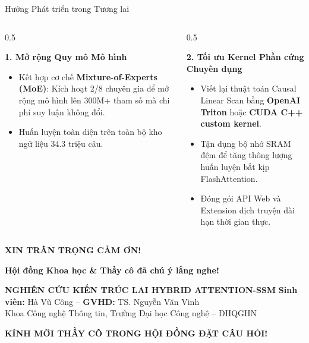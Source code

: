 \documentclass[aspectratio=169, 10pt]{beamer}
\begin{document}
\begin{frame}{Hướng Phát triển trong Tương lai}
  \begin{columns}
    \begin{column}{0.5\textwidth}
      \begin{block}{\textbf{1. Mở rộng Quy mô Mô hình}}
        \begin{itemize}
          \item Kết hợp cơ chế \textbf{Mixture-of-Experts (MoE)}:
            Kích hoạt 2/8 chuyên gia để mở rộng mô hình lên 300M+ tham số mà chi phí suy luận không đổi.
          \item Huấn luyện toàn diện trên toàn bộ kho ngữ liệu 34.3 triệu câu.
        \end{itemize}
      \end{block}
    \end{column}
    \begin{column}{0.5\textwidth}
      \begin{block}{\textbf{2. Tối ưu Kernel Phần cứng Chuyên dụng}}
        \begin{itemize}
          \item Viết lại thuật toán Causal Linear Scan bằng \textbf{OpenAI Triton} hoặc \textbf{CUDA C++ custom kernel}.
          \item Tận dụng bộ nhớ SRAM đệm để tăng thông lượng huấn luyện bắt kịp FlashAttention.
          \item Đóng gói API Web và Extension dịch truyện dài hạn thời gian thực.
        \end{itemize}
      \end{block}
    \end{column}
  \end{columns}
\end{frame}

\begin{frame}[plain]
  \vfill
  \centering
  {\Huge\color{UETBlue}\textbf{XIN TRÂN TRỌNG CẢM ƠN!}\par}
  \vspace{0.4cm}
  {\Large\textbf{Hội đồng Khoa học \& Thầy cô đã chú ý lắng nghe!}\par}
  \vspace{0.6cm}
  \begin{block}{\centering\textbf{NGHIÊN CỨU KIẾN TRÚC LAI HYBRID ATTENTION-SSM}}
    \centering
    \textbf{Sinh viên:} Hà Vũ Công -- \textbf{GVHD:} TS. Nguyễn Văn Vinh\\
    Khoa Công nghệ Thông tin, Trường Đại học Công nghệ -- ĐHQGHN
  \end{block}
  \vspace{0.4cm}
  {\large\textbf{\color{UETGold}KÍNH MỜI THẦY CÔ TRONG HỘI ĐỒNG ĐẶT CÂU HỎI!}\par}
  \vfill
\end{frame}
\end{document}
